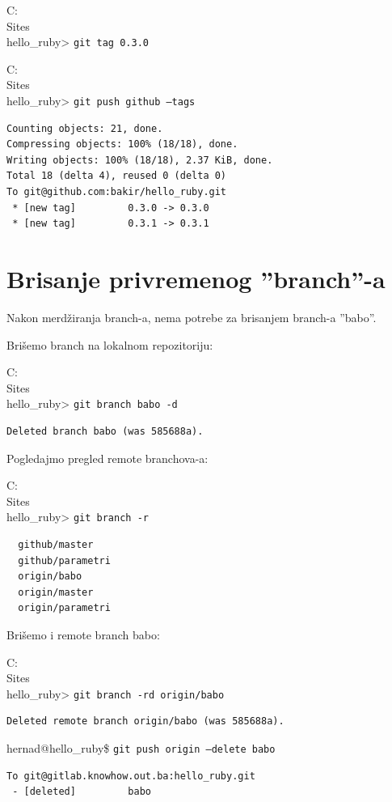 \documentclass[times, utf8, seminar]{fit}
\begin{document}
C:\\Sites\\hello\_ruby> \texttt{git tag 0.3.0}

C:\\Sites\\hello\_ruby> \texttt{git push github --tags}
\begin{lstlisting}
Counting objects: 21, done.
Compressing objects: 100% (18/18), done.
Writing objects: 100% (18/18), 2.37 KiB, done.
Total 18 (delta 4), reused 0 (delta 0)
To git@github.com:bakir/hello_ruby.git
 * [new tag]         0.3.0 -> 0.3.0
 * [new tag]         0.3.1 -> 0.3.1
\end{lstlisting}

\section{Brisanje privremenog ''branch''-a }

Nakon merdžiranja branch-a, nema potrebe za brisanjem branch-a ''babo''.  

Brišemo branch na lokalnom repozitoriju:

C:\\Sites\\hello\_ruby> \texttt{git branch babo -d}
\begin{lstlisting}
Deleted branch babo (was 585688a).
\end{lstlisting}

Pogledajmo pregled remote branchova-a:

C:\\Sites\\hello\_ruby> \texttt{git branch -r}
\begin{lstlisting}
  github/master
  github/parametri
  origin/babo
  origin/master
  origin/parametri
\end{lstlisting}

Brišemo i remote branch babo:

C:\\Sites\\hello\_ruby> \texttt{git branch -rd origin/babo}
\begin{lstlisting}
Deleted remote branch origin/babo (was 585688a).
\end{lstlisting}

hernad@hello\_ruby\$ \texttt{git push origin --delete babo}
\begin{lstlisting}
To git@gitlab.knowhow.out.ba:hello_ruby.git
 - [deleted]         babo
\end{lstlisting}
\end{document}
